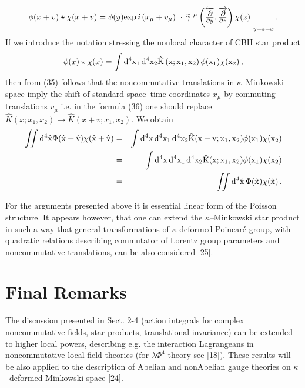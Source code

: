 \documentclass[a4paper,a4paper]{article}
\newcommand\D{\rm d }
\begin{document}
\begin{eqnarray}
\phi (x + v) \star \chi(x + v) %
=
 \phi(y) 
\hbox{exp} \, i
\left(
 x_{\mu} +v_{\mu} \right) 
 \  \cdot \, \widetilde{\gamma} \ ^{\mu} 
   \left(
 \overleftarrow{\partial \over \partial y}, 
  \overrightarrow{\partial \over \partial z}
  \right)
  \chi(z)\Bigg|_{y=z=x} \, .
  \end{eqnarray}
If we introduce the notation stressing the nonlocal character of
CBH star product
\begin{equation}
\phi(x)  \star \chi(x) =
\int \D^{4} x_{1} \, \D^{4}x_{2} 
\hat{K}\left(x;x_{1},x_{2}\right)
\phi(x_{1})
\chi(x_{2})\, ,
\end{equation}
then from (35) follows that the 
 noncommutative translations in $\kappa$--Minkowski space imply
the shift of standard space--time coordinates $x_{\mu}$ by
commuting translations $v_{\mu}$ i.e. in the formula (36) one 
should replace
 $\hat{K}(x;x_{1},x_{2}) \to 
\hat{K}(x+v;x_{1},x_{2})$.
We obtain
\begin{eqnarray}
 \int\!\!\!\int \D^4  {\hat{x}}
 \Phi(\hat{x} + \hat{v}) \chi(\hat{x}+\hat{v}) & =& 
 \int \D^{4}x \, \D^{4}x_{1}\, \D^{4}x_{2}
 \hat{K}(x+v; x_{1},x_{2}) \phi(x_{1})\chi(x_{2})
 \cr
 & = &
  \int \D^{4}x \, \D^{4}x_{1}\, \D^{4}x_{2}
 \hat{K}(x; x_{1},x_{2}) \phi(x_{1})\chi(x_{2})
 \cr
& = &
  \int\!\!\!\int \D^4  {\hat{x}} \, \Phi(\hat{x})
  \chi(\hat{x}) \, .
  \end{eqnarray}
 

For the arguments presented above it is essential linear form of
the Poisson structure.
It appears however, that one can extend the $\kappa$--Minkowski
star product in such a way that general transformations of
$\kappa$-deformed Poincar\'{e} group, with quadratic relations
describing commutator of Lorentz group parameters and
noncommutative translations, can be also considered [25].

\section{Final Remarks}

The discussion presented in Sect. 2-4 (action integrals for
complex noncommutative fields, star products, translational
invariance) can be extended to higher local powers, describing
e.g. the interaction Lagrangeans in noncommutative local field
theories  (for $ \lambda \Phi^{4}$ theory see [18]). These
results will be also applied to the description of Abelian and 
nonAbelian
 gauge  theories on $\kappa$--deformed Minkowski space [24].
\end{document}
